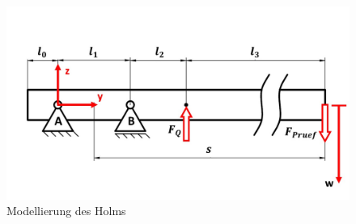\begin{figure}

	\includegraphics[width=1.0\textwidth]{Bilder/Balkenmodell.jpg}
	\caption{Modellierung des Holms}
\end{figure}
